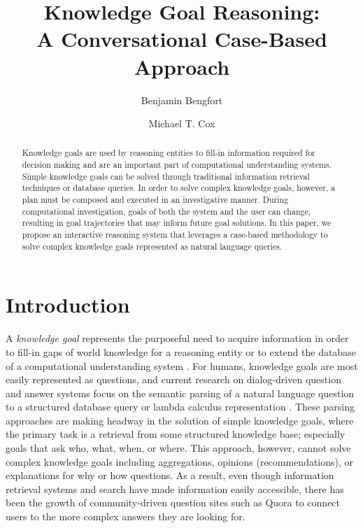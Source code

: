 \documentclass{llncs}
\begin{document}
\title{Knowledge Goal Reasoning:\\
A Conversational Case-Based Approach}

\author{Benjamin Bengfort \and Michael T. Cox}


\maketitle


\begin{abstract}
Knowledge goals are used by reasoning entities to fill-in information required for decision making and are an important part of computational understanding systems. Simple knowledge goals can be solved through traditional information retrieval techniques or database queries. In order to solve complex knowledge goals, however, a plan must be composed and executed in an investigative manner. During computational investigation, goals of both the system and the user can change, resulting in goal trajectories that may inform future goal solutions. In this paper, we propose an interactive reasoning system that leverages a case-based methodology to solve complex knowledge goals represented as natural language queries.
\end{abstract}

\section{Introduction}

A \textit{knowledge goal} represents the purposeful need to acquire information in order to fill-in gaps of world knowledge for a reasoning entity or to extend the database of a computational understanding system \cite{ram_goal-based_1991}. For humans, knowledge goals are most easily represented as questions, and current research on dialog-driven question and answer systems focus on the semantic parsing of a natural language question to a structured database query \cite{yahya_natural_2012} or lambda calculus representation \cite{berant_semantic_2013}. These parsing approaches are making headway in the solution of simple knowledge goals, where the primary task is a retrieval from some structured knowledge base; especially goals that ask who, what, when, or where. This approach, however, cannot solve complex knowledge goals including aggregations, opinions (recommendations), or explanations for why or how questions. As a result, even though information retrieval systems and search have made information easily accessible, there has been the growth of community-driven question sites such as Quora \cite{wang_wisdom_2013} to connect users to the more complex answers they are looking for.
\end{document}
